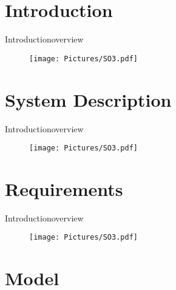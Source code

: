 \section{Introduction}

\begin{frame}{Introduction}{overview}
  \begin{figure}[H]
	\centering
	\texttt{[image: Pictures/SO3.pdf]}
  \end{figure}
\end{frame}


\section{System Description}

\begin{frame}{Introduction}{overview}
	\begin{figure}[H]
		\centering
		\texttt{[image: Pictures/SO3.pdf]}
	\end{figure}
\end{frame}


\section{Requirements}

\begin{frame}{Introduction}{overview}
	\begin{figure}[H]
		\centering
		\texttt{[image: Pictures/SO3.pdf]}
	\end{figure}
\end{frame}


\section{Model}

